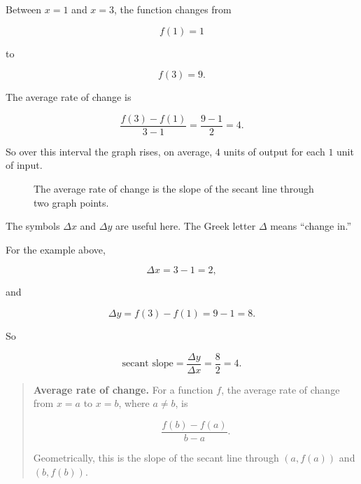 Between \(x=1\) and \(x=3\), the function changes from

\[
f(1)=1
\]

to

\[
f(3)=9.
\]

The average rate of change is

\[
\frac{f(3)-f(1)}{3-1}
=
\frac{9-1}{2}
=
4.
\]

So over this interval the graph rises, on average, \(4\) units of output for each \(1\) unit of input.

\begin{figure}[h]
\centering
{}
\caption{The average rate of change is the slope of the secant line through two graph points.}
\label{fig:secant-slope-parabola}
\end{figure}

The symbols \(\Delta x\) and \(\Delta y\) are useful here.  The Greek letter \(\Delta\) means ``change in.''

For the example above,

\[
\Delta x=3-1=2,
\]

and

\[
\Delta y=f(3)-f(1)=9-1=8.
\]

So

\[
\text{secant slope}
=
\frac{\Delta y}{\Delta x}
=
\frac{8}{2}
=
4.
\]

\begin{quote}
\textbf{Average rate of change.}
For a function \(f\), the average rate of change from \(x=a\) to \(x=b\), where \(a\neq b\), is

\[
\boxed{
\frac{f(b)-f(a)}{b-a}.
}
\]

Geometrically, this is the slope of the secant line through \((a,f(a))\) and \((b,f(b))\).
\end{quote}

